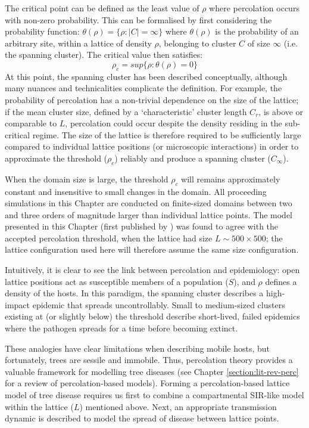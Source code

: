 The critical point can be defined as the least value of $\rho$ where percolation occurs with non-zero probability. %
This can be formalised by first considering the probability function: $\theta (\rho)= \lbrace \rho:|C|=\infty\rbrace$ where $\theta(\rho)$ is the probability of an arbitrary site, %
within a lattice of density $\rho$, belonging to cluster $C$ of size $\infty$ (i.e. the spanning cluster). %
The critical value then satisfies: %
\begin{equation}
\label{eq:critical_threshold_1d}
    \rho _{c}=sup \lbrace \rho : \theta (\rho ) = 0 \rbrace
\end{equation}
At this point, the spanning cluster has been described conceptually, although many nuances and technicalities complicate the definition. %
For example, the probability of percolation has a non-trivial dependence on the size of the lattice;
if the mean cluster size, defined by a `characteristic' cluster length $C_r$, is above or comparable to $L$, 
percolation could occur despite the density residing in the sub-critical regime. %
The size of the lattice is therefore required to be sufficiently large compared to individual lattice positions (or microscopic interactions) 
in order to approximate the threshold ($\rho_c$) reliably and produce a spanning cluster ($C_{\infty}$). 

When the domain size is large, the threshold $\rho_c$ will remains approximately constant and insensitive to small changes in the domain. 
All proceeding simulations in this Chapter are conducted on finite-sized domains between two and three orders of magnitude larger than individual lattice points.
The model presented in this Chapter (first published by \cite{OROZCOFUENTES201912}) was 
found to agree with the accepted percolation threshold, when the lattice had size $L \sim 500\times500$;
the lattice configuration used here will therefore assume the same size configuration. 

Intuitively, it is clear to see the link between percolation and epidemiology: 
open lattice positions act as susceptible members of a population ($S$), and $\rho$ defines a density of the hosts. 
In this paradigm, the spanning cluster describes a high-impact epidemic that spreads uncontrollably. 
Small to medium-sized clusters existing at (or slightly below) the threshold describe short-lived, 
failed epidemics where the pathogen spreads for a time before becoming extinct.

These analogies have clear limitations when describing mobile hosts, but fortunately, trees are sessile and immobile.
Thus, percolation theory provides a valuable framework for modelling tree diseases (see Chapter \ref{section:lit-rev-perc} 
for a review of percolation-based models). 
Forming a percolation-based lattice model of tree disease requires us first to combine a compartmental SIR-like model within the lattice ($L$) mentioned above. %
Next, an appropriate transmission dynamic is described to model the spread of disease between lattice points.


